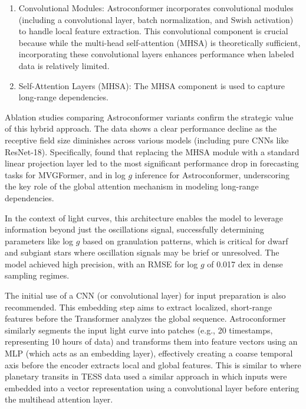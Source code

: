 \documentclass[letterpaper]{article} %
\begin{document}
\begin{enumerate}
    \item {Convolutional Modules:} Astroconformer incorporates convolutional modules (including a convolutional layer, batch normalization, and Swish activation) to handle local feature extraction. This convolutional component is crucial because while the multi-head self-attention (MHSA) is theoretically sufficient, incorporating these convolutional layers enhances performance when labeled data is relatively limited.
    
    \item {Self-Attention Layers (MHSA):} The MHSA component is used to capture long-range dependencies.
\end{enumerate}

Ablation studies comparing Astroconformer variants confirm the strategic value of this hybrid approach. The data shows a clear performance decline as the receptive field size diminishes across various models (including pure CNNs like ResNet-18). Specifically, \citeauthor{pan2024astroconformer} found that replacing the MHSA module with a standard linear projection layer led to the most significant performance drop in forecasting tasks for MVGFormer, and in log $g$ inference for Astroconformer, underscoring the key role of the global attention mechanism in modeling long-range dependencies.

In the context of light curves, this architecture enables the model to leverage information beyond just the oscillations signal, successfully determining parameters like log $g$ based on granulation patterns, which is critical for dwarf and subgiant stars where oscillation signals may be brief or unresolved. The model achieved high precision, with an RMSE for log $g$ of 0.017 dex in dense sampling regimes.

The initial use of a CNN (or convolutional layer) for input preparation is also recommended. This embedding step aims to extract localized, short-range features before the Transformer analyzes the global sequence. Astroconformer similarly segments the input light curve into patches (e.g., 20 timestamps, representing 10 hours of data) and transforms them into feature vectors using an MLP (which acts as an embedding layer), effectively creating a coarse temporal axis before the encoder extracts local and global features. This is similar to \cite{salinas2023distinguishingtransitfalsepositives} where planetary transits in TESS data used a similar approach in which inputs were embedded into a vector representation using a convolutional layer before entering the multihead attention layer. 
\end{document}
